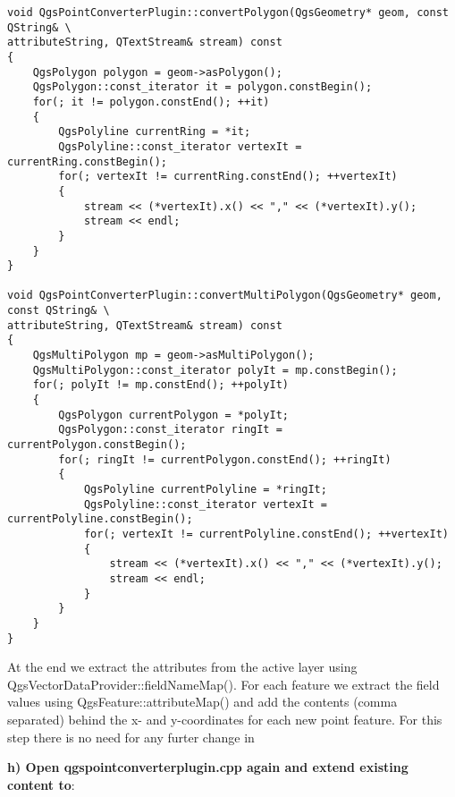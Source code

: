 \begin{verbatim}
void QgsPointConverterPlugin::convertPolygon(QgsGeometry* geom, const QString& \
attributeString, QTextStream& stream) const
{
    QgsPolygon polygon = geom->asPolygon();
    QgsPolygon::const_iterator it = polygon.constBegin();
    for(; it != polygon.constEnd(); ++it)
    {
        QgsPolyline currentRing = *it;
        QgsPolyline::const_iterator vertexIt = currentRing.constBegin();
        for(; vertexIt != currentRing.constEnd(); ++vertexIt)
        {
            stream << (*vertexIt).x() << "," << (*vertexIt).y();
            stream << endl;
        }
    }
}

void QgsPointConverterPlugin::convertMultiPolygon(QgsGeometry* geom, const QString& \
attributeString, QTextStream& stream) const
{
    QgsMultiPolygon mp = geom->asMultiPolygon();
    QgsMultiPolygon::const_iterator polyIt = mp.constBegin();
    for(; polyIt != mp.constEnd(); ++polyIt)
    {
        QgsPolygon currentPolygon = *polyIt;
        QgsPolygon::const_iterator ringIt = currentPolygon.constBegin();
        for(; ringIt != currentPolygon.constEnd(); ++ringIt)
        {
            QgsPolyline currentPolyline = *ringIt;
            QgsPolyline::const_iterator vertexIt = currentPolyline.constBegin();
            for(; vertexIt != currentPolyline.constEnd(); ++vertexIt)
            {
                stream << (*vertexIt).x() << "," << (*vertexIt).y();
                stream << endl;
            }
        }
    }
}
\end{verbatim}


At the end we extract the attributes from the active layer using 
QgsVectorDataProvider::fieldNameMap(). For each feature we extract the field 
values using QgsFeature::attributeMap() and add the contents (comma separated) 
behind the x- and y-coordinates for each new point feature. For this step 
there is no need for any furter change in \filename{qgspointconverterplugin.h} 

\textbf{h) Open qgspointconverterplugin.cpp again and extend existing content
to}:

